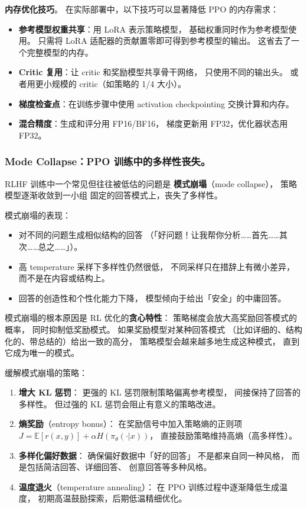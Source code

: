 \textbf{内存优化技巧}。
在实际部署中，以下技巧可以显著降低 PPO 的内存需求：
\begin{itemize}[noitemsep]
  \item \textbf{参考模型权重共享}：用 LoRA 表示策略模型，
        基础权重同时作为参考模型使用。
        只需将 LoRA 适配器的贡献置零即可得到参考模型的输出。
        这省去了一个完整模型的内存。
  \item \textbf{Critic 复用}：让 critic 和奖励模型共享骨干网络，
        只使用不同的输出头。
        或者用更小规模的 critic（如策略的 1/4 大小）。
  \item \textbf{梯度检查点}：在训练步骤中使用
        activation checkpointing 交换计算和内存。
  \item \textbf{混合精度}：生成和评分用 FP16/BF16，
        梯度更新用 FP32，优化器状态用 FP32。
\end{itemize}

\subsubsection{Mode Collapse：PPO 训练中的多样性丧失。}

RLHF 训练中一个常见但往往被低估的问题是
\textbf{模式崩塌}（mode collapse），
策略模型逐渐收敛到一小组
固定的回答模式上，丧失了多样性。

模式崩塌的表现：
\begin{itemize}[noitemsep]
  \item 对不同的问题生成相似结构的回答
       （「好问题！让我帮你分析……首先……其次……总之……」）。
  \item 高 temperature 采样下多样性仍然很低，
        不同采样只在措辞上有微小差异，而不是在内容或结构上。
  \item 回答的创造性和个性化能力下降，
        模型倾向于给出「安全」的中庸回答。
\end{itemize}

模式崩塌的根本原因是 RL 优化的\textbf{贪心特性}：
策略梯度会放大高奖励回答模式的概率，
同时抑制低奖励模式。
如果奖励模型对某种回答模式
（比如详细的、结构化的、带总结的）给出一致的高分，
策略模型会越来越多地生成这种模式，
直到它成为唯一的模式。

缓解模式崩塌的策略：
\begin{enumerate}[noitemsep]
  \item \textbf{增大 KL 惩罚}：
        更强的 KL 惩罚限制策略偏离参考模型，
        间接保持了回答的多样性。
        但过强的 KL 惩罚会阻止有意义的策略改进。
  \item \textbf{熵奖励}（entropy bonus）：
        在奖励信号中加入策略熵的正则项
        $J = \mathbb{E}[r(x,y)] + \alpha H(\pi_\theta(\cdot|x))$，
        直接鼓励策略维持高熵（高多样性）。
  \item \textbf{多样化偏好数据}：
        确保偏好数据中「好的回答」
        不是都来自同一种风格，
        而是包括简洁回答、详细回答、
        创意回答等多种风格。
  \item \textbf{温度退火}（temperature annealing）：
        在 PPO 训练过程中逐渐降低生成温度，
        初期高温鼓励探索，后期低温精细优化。
\end{enumerate}

